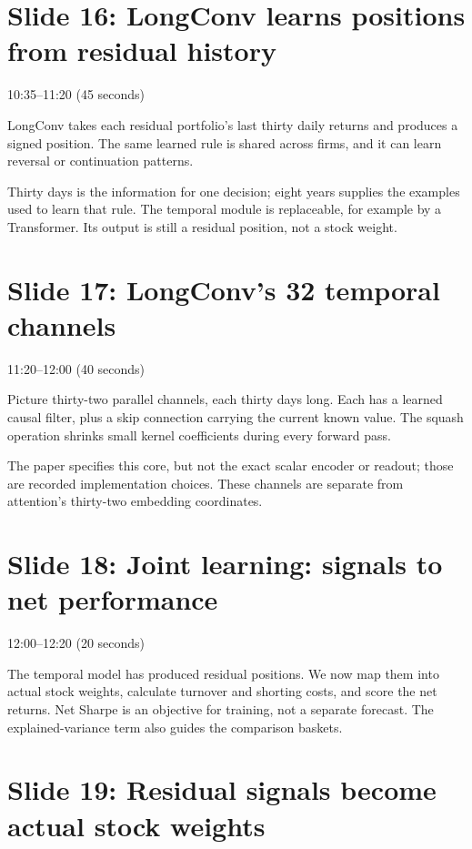 \documentclass[11pt]{article}
\begin{document}
\section*{Slide 16: LongConv learns positions from residual history}

\textcolor{SBred}{10:35--11:20 (45 seconds)}

LongConv takes each residual portfolio's last thirty daily returns and produces a signed position. The same learned rule is shared across firms, and it can learn reversal or continuation patterns.

Thirty days is the information for one decision; eight years supplies the examples used to learn that rule. The temporal module is replaceable, for example by a Transformer. Its output is still a residual position, not a stock weight.

\section*{Slide 17: LongConv's 32 temporal channels}

\textcolor{SBred}{11:20--12:00 (40 seconds)}

Picture thirty-two parallel channels, each thirty days long. Each has a learned causal filter, plus a skip connection carrying the current known value. The squash operation shrinks small kernel coefficients during every forward pass.

The paper specifies this core, but not the exact scalar encoder or readout; those are recorded implementation choices. These channels are separate from attention's thirty-two embedding coordinates.

\section*{Slide 18: Joint learning: signals to net performance}

\textcolor{SBred}{12:00--12:20 (20 seconds)}

The temporal model has produced residual positions. We now map them into actual stock weights, calculate turnover and shorting costs, and score the net returns. Net Sharpe is an objective for training, not a separate forecast. The explained-variance term also guides the comparison baskets.

\section*{Slide 19: Residual signals become actual stock weights}
\end{document}
